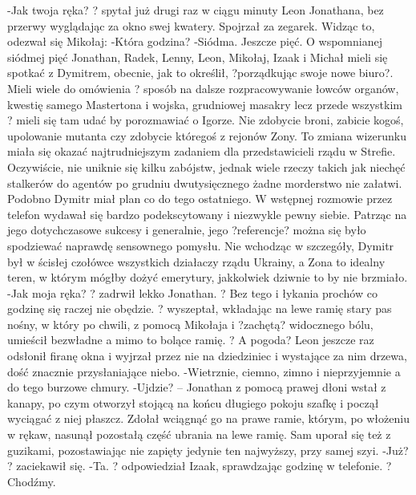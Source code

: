 \documentclass[../MAIN.tex]{subfiles}
\begin{document}
-Jak twoja ręka? ? spytał już drugi raz w ciągu minuty Leon Jonathana, bez przerwy wyglądając za okno swej kwatery. Spojrzał za zegarek. Widząc to, odezwał się Mikołaj:
-Która godzina?
-Siódma. Jeszcze pięć.
O wspomnianej siódmej pięć Jonathan, Radek, Lenny, Leon, Mikołaj, Izaak i Michał mieli się spotkać z Dymitrem, obecnie, jak to określił, ?porządkując swoje nowe biuro?. Mieli wiele do omówienia ? sposób na dalsze rozpracowywanie łowców organów, kwestię samego Mastertona i wojska, grudniowej masakry lecz przede wszystkim ? mieli się tam udać by porozmawiać o Igorze.
Nie zdobycie broni, zabicie kogoś, upolowanie mutanta czy zdobycie któregoś z rejonów Zony.
To zmiana wizerunku miała się okazać najtrudniejszym zadaniem dla przedstawicieli rządu w Strefie. Oczywiście, nie uniknie się kilku zabójstw, jednak wiele rzeczy takich jak niechęć stalkerów do agentów po grudniu dwutysięcznego żadne morderstwo nie załatwi.
Podobno Dymitr miał plan co do tego ostatniego. W wstępnej rozmowie przez telefon wydawał się bardzo podekscytowany i niezwykle pewny siebie. Patrząc na jego dotychczasowe sukcesy i generalnie, jego ?referencje? można się było spodziewać naprawdę sensownego pomysłu. Nie wchodząc w szczegóły, Dymitr był w ścisłej czołówce wszystkich działaczy rządu Ukrainy, a Zona to idealny teren, w którym mógłby dożyć emerytury, jakkolwiek dziwnie to by nie brzmiało.
-Jak moja ręka? ? zadrwił lekko Jonathan. ? Bez tego i łykania prochów co godzinę się raczej nie obędzie. ? wyszeptał, wkładając na lewe ramię stary pas nośny, w który po chwili, z pomocą Mikołaja i ?zachętą? widocznego bólu, umieścił bezwładne a mimo to bolące ramię. ? A pogoda?
Leon jeszcze raz odsłonił firanę okna i wyjrzał przez nie na dziedziniec i wystające za nim drzewa, dość znacznie przysłaniające niebo.
-Wietrznie, ciemno, zimno i nieprzyjemnie a do tego burzowe chmury.
-Ujdzie? -- Jonathan z pomocą prawej dłoni wstał z kanapy, po czym otworzył stojącą na końcu długiego pokoju szafkę i począł wyciągać z niej płaszcz. Zdołał wciągnąć go na prawe ramie, którym, po włożeniu w rękaw, nasunął pozostałą część ubrania na lewe ramię. Sam uporał się też z guzikami, pozostawiając nie zapięty jedynie ten najwyższy, przy samej szyi.
-Już? ? zaciekawił się.
-Ta. ? odpowiedział Izaak, sprawdzając godzinę w telefonie. ? Chodźmy.
\end{document}
